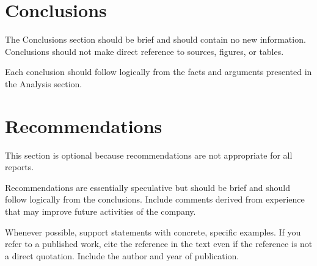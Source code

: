 \documentclass[12pt]{article}
\begin{document}




\newpage
\section{Conclusions}


The Conclusions section should be brief and should contain no new information. Conclusions should not make direct reference to sources, figures, or tables.

Each conclusion should follow logically from the facts and arguments presented in the Analysis section.

\newpage
\section{Recommendations}


This section is optional because recommendations are not appropriate for all reports.

Recommendations are essentially speculative but should be brief and should follow logically from the conclusions. Include comments derived from experience that may improve future activities of the company.




Whenever possible, support statements with concrete, specific examples. If you refer to a published work, cite the reference in the text even if the reference is not a direct quotation. Include the author and year of publication.
\end{document}
